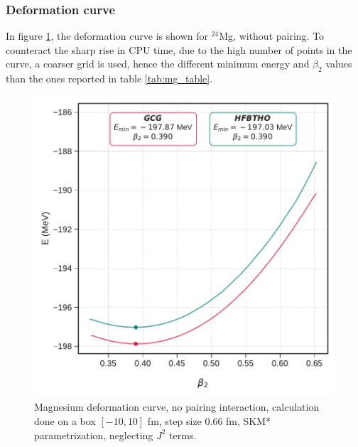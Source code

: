 \subsubsection{Deformation curve}
In figure \ref{fig:mg_no_pair_deformation}, the deformation curve is shown for $^{24}$Mg, without pairing. To counteract the sharp rise in CPU time, due to the high number of points in the curve, a coarser grid is used, hence the different minimum energy and $\beta_2$ values than the ones reported in table \ref{tab:mg_table}.
\begin{figure}[h]
  \centering
  \includegraphics[width=0.8\linewidth]{Images/mg_nopair_curve.pdf}
  \caption{Magnesium deformation curve, no pairing interaction, calculation done on a box $[-10, 10]$ fm, step size 0.66 fm, SKM* parametrization, neglecting $J^2$ terms.}
  \label{fig:mg_no_pair_deformation}
\end{figure}